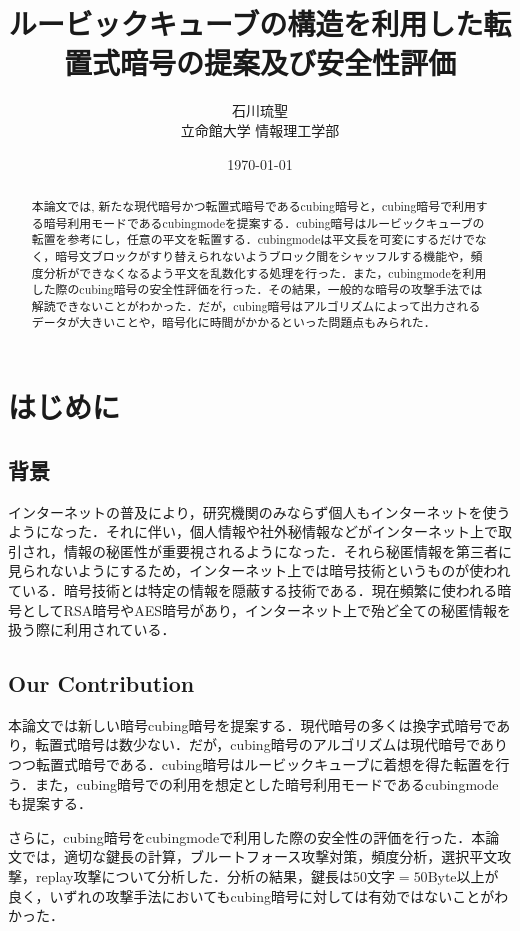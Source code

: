 \documentclass[a4j,titlepage]{jsarticle}
\title{ルービックキューブの構造を利用した転置式暗号の提案及び安全性評価}
\author{石川琉聖\\立命館大学 情報理工学部}
\date{\today}
\begin{document}
\maketitle

\begin{abstract}
本論文では, 新たな現代暗号かつ転置式暗号であるcubing暗号と，cubing暗号で利用する暗号利用モードであるcubingmodeを提案する．cubing暗号はルービックキューブの転置を参考にし，任意の平文を転置する．cubingmodeは平文長を可変にするだけでなく，暗号文ブロックがすり替えられないようブロック間をシャッフルする機能や，頻度分析ができなくなるよう平文を乱数化する処理を行った．また，cubingmodeを利用した際のcubing暗号の安全性評価を行った．その結果，一般的な暗号の攻撃手法では解読できないことがわかった．だが，cubing暗号はアルゴリズムによって出力されるデータが大きいことや，暗号化に時間がかかるといった問題点もみられた．
\end{abstract}

\setcounter{tocdepth}{3}
\tableofcontents
\newpage
{}

\section{はじめに}
\subsection{背景}
インターネットの普及により，研究機関のみならず個人もインターネットを使うようになった．それに伴い，個人情報や社外秘情報などがインターネット上で取引され，情報の秘匿性が重要視されるようになった．それら秘匿情報を第三者に見られないようにするため，インターネット上では暗号技術というものが使われている．暗号技術とは特定の情報を隠蔽する技術である．現在頻繁に使われる暗号としてRSA暗号やAES暗号があり，インターネット上で殆ど全ての秘匿情報を扱う際に利用されている．

\subsection{Our Contribution}
本論文では新しい暗号cubing暗号を提案する．現代暗号の多くは換字式暗号であり，転置式暗号は数少ない．だが，cubing暗号のアルゴリズムは現代暗号でありつつ転置式暗号である．cubing暗号はルービックキューブに着想を得た転置を行う．また，cubing暗号での利用を想定とした暗号利用モードであるcubingmodeも提案する．

さらに，cubing暗号をcubingmodeで利用した際の安全性の評価を行った．本論文では，適切な鍵長の計算，ブルートフォース攻撃対策，頻度分析，選択平文攻撃，replay攻撃について分析した．分析の結果，鍵長は\(50\)文字\(=50\text{Byte}\)以上が良く，いずれの攻撃手法においてもcubing暗号に対しては有効ではないことがわかった．
\end{document}
